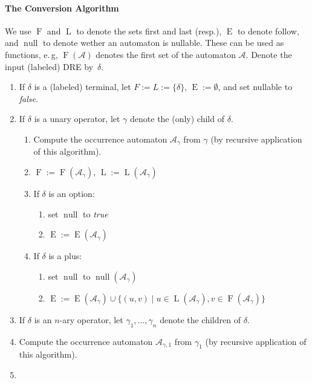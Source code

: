 \documentclass[a4paper,11pt, svgnames,titlepage]{article}
\newcommand{\df}{:=}
\DeclareMathOperator{\first}{F}
\DeclareMathOperator{\last}{L}
\DeclareMathOperator{\follow}{E}
\DeclareMathOperator{\nullable}{null}
\begin{document}
\paragraph{The Conversion Algorithm}
We use $\first$ and $\last$ to denote the sets first and last (resp.), $\follow$ to denote follow, and $\nullable$ to denote wether an automaton is nullable. These can be used as functions, e.\,g, $\first(\mathcal{A})$ denotes the first set of the automaton $\mathcal{A}$. Denote the input (labeled) DRE by~$\delta$.
\begin{enumerate}
	\item If $\delta$ is a (labeled) terminal, let $F\df L\df \{\delta\}$, $\follow\df\emptyset$, and set nullable to \emph{false}.
	\item If $\delta$ is a unary operator, let $\gamma$ denote the (only) child of $\delta$.
	\begin{enumerate}[label*=\arabic*.]
		\item Compute the occurrence automaton $\mathcal{A}_{\gamma}$ from $\gamma$ (by recursive application of this algorithm).
		\item $\first\df \first(\mathcal{A}_{\gamma})$, $\last\df \last(\mathcal{A}_{\gamma})$
			\item If $\delta$ is an option: 
			\begin{enumerate}[label*=\arabic*.]
				\item set $\nullable$ to \emph{true}
				\item $\follow\df \follow(\mathcal{A}_{\gamma})$
			\end{enumerate}
			\item If $\delta$ is a plus:
			\begin{enumerate}[label*=\arabic*.]
				\item set $\nullable$ to $\nullable(\mathcal{A}_{\gamma})$
				\item $\follow\df \follow(\mathcal{A}_{\gamma})\cup \{(u,v)\mid u\in\last(\mathcal{A}_{\gamma}), v\in\first(\mathcal{A}_{\gamma})\}$
			\end{enumerate}
	\end{enumerate}
	\item If $\delta$ is an $n$-ary operator, let $\gamma_1,\ldots,\gamma_n$ denote the children of $\delta$.
	\item Compute the occurrence automaton $\mathcal{A}_{\gamma,1}$ from $\gamma_1$ (by recursive application of this algorithm).
	\item
	\begin{enumerate}[label*=\arabic*.]

\end{enumerate}
\end{enumerate}
\end{document}
